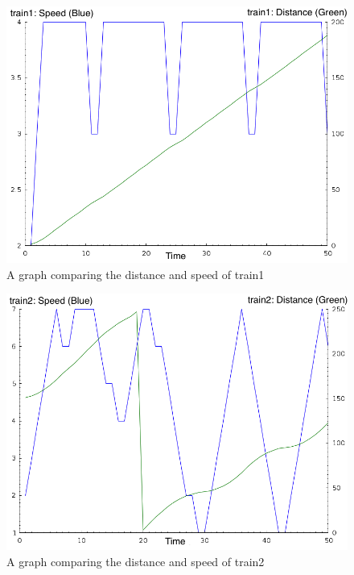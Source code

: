 \begin{figure}

\begin{center}
\includegraphics[scale=0.5]{t1graph.png}
\end{center}
\caption{A graph comparing the distance and speed of train1}
\label{t1graph}
\end{figure}

\begin{figure}

\begin{center}
\includegraphics[scale=0.5]{t2graph.png}
\end{center}
\caption{A graph comparing the distance and speed of train2}
\label{t2graph}
\end{figure}

